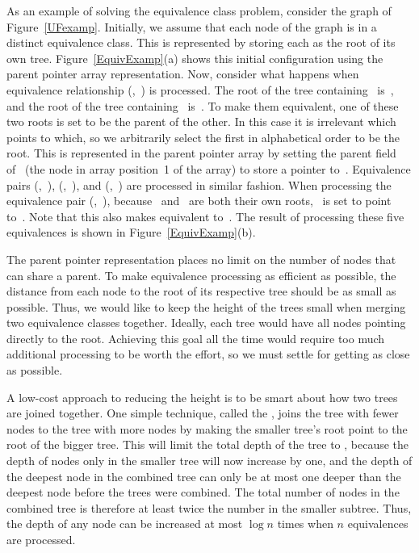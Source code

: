 \begin{example}
As an example of solving the equivalence class problem, consider the
graph of Figure~\ref{UFexamp}.
Initially, we assume that each node of the graph is in a distinct
equivalence class.
This is represented by storing each as the root of its own tree.
Figure~\ref{EquivExamp}(a) shows this initial configuration using the
parent pointer array representation.
Now, consider what happens when equivalence relationship
(,~) is processed.
The root of the tree containing~ is~, and the root of
the tree containing~ is~.
To make them equivalent, one of these two roots is set to be the
parent of the other.
In this case it is irrelevant which points to which, so we arbitrarily
select the first in alphabetical order to be the root.
This is represented in the parent pointer array by setting the parent
field of~ (the node in array position~1 of the array)
to store a pointer to~.
Equivalence pairs (,~), (,~), and
(,~) are processed in similar fashion.
When processing the equivalence pair (,~),
because~ and~ are both their own roots,
~is set to point to~.
Note that this also makes  equivalent to~.
The result of processing these five equivalences is shown in
Figure~\ref{EquivExamp}(b).
\end{example}

The parent pointer representation places no limit on the number of
nodes that can share a parent.
To make equivalence processing as efficient as possible, 
the distance from each node to the root of its respective tree should
be as small as possible.
Thus, we would like to keep the height of the trees small when merging
two equivalence classes together.
Ideally, each tree would have all nodes pointing directly to the root.
Achieving this goal all the time would require too much additional
processing to be worth the effort, so we must settle for getting as
close as possible.

A low-cost approach to reducing the height is to be smart about how
two trees are joined together.
One simple technique, called the
,
joins the tree with fewer nodes to the tree with more nodes by making
the smaller tree's root point to the root of the bigger tree.
This will limit the total depth of the tree to \Ologn, because the
depth of nodes only in the smaller tree will now increase by one,
and the depth of the deepest node in the combined tree can only be at
most one deeper than the deepest node before the trees were combined.
The total number of nodes in the combined tree is therefore at least
twice the number in the smaller subtree.
Thus, the depth of any node can be increased at most \(\log n\) times
when \(n\) equivalences are processed.


